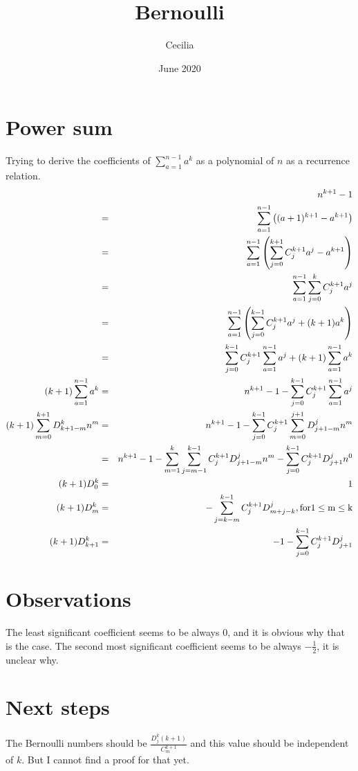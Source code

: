 \documentclass{article}
\title{Bernoulli}
\author{Cecilia}
\date{June 2020}
\begin{document}
\maketitle
\section{Power sum}
Trying to derive the coefficients of $ \sum\limits_{a=1}^{n-1} a^k $ as a polynomial of $ n $ as a recurrence relation.
\begin{eqnarray*}
& & n^{k+1} - 1 \\
  &=& \sum\limits_{a=1}^{n-1} \left((a + 1)^{k+1} - a^{k+1}\right) \\
  &=& \sum\limits_{a=1}^{n-1} \left(\sum\limits_{j=0}^{k+1}C_j^{k+1}a^j - a^{k+1}\right) \\
  &=& \sum\limits_{a=1}^{n-1} \sum\limits_{j=0}^{k}C_j^{k+1}a^j \\
  &=& \sum\limits_{a=1}^{n-1} \left(\sum\limits_{j=0}^{k-1}C_j^{k+1}a^j + (k+1)a^k \right) \\
  &=& \sum\limits_{j=0}^{k-1}C_j^{k+1}\sum\limits_{a=1}^{n-1} a^j + (k+1)\sum\limits_{a=1}^{n-1} a^k \\  
  (k+1)\sum\limits_{a=1}^{n-1} a^k &=& n^{k+1} - 1 - \sum\limits_{j=0}^{k-1}C_j^{k+1}\sum\limits_{a=1}^{n-1} a^j \\
  (k+1)\sum\limits_{m=0}^{k+1}D_{k+1-m}^kn^m &=& n^{k+1} - 1 - \sum\limits_{j=0}^{k-1}C_j^{k+1}\sum\limits_{m=0}^{j+1}D_{j+1-m}^jn^m \\
  &=& n^{k+1} - 1 - \sum\limits_{m=1}^{k}\sum\limits_{j=m-1}^{k-1}C_j^{k+1}D_{j+1-m}^jn^m - \sum\limits_{j=0}^{k-1}C_j^{k+1}D_{j+1}^jn^0 \\
  (k+1)D_0^k &=& 1 \\
  (k+1)D_m^k &=& -\sum\limits_{j=k-m}^{k-1}C_j^{k+1}D_{m+j-k}^j  \rm {, for } 1 \le m \le k \\
  (k+1)D_{k+1}^k &=& -1 -\sum\limits_{j=0}^{k-1}C_j^{k+1}D_{j+1}^j
\end{eqnarray*}

\section{Observations}
The least significant coefficient seems to be always 0, and it is obvious why that is the case. The second most significant coefficient seems to be always $ -\frac{1}{2} $, it is unclear why.

\section{Next steps}
The Bernoulli numbers should be $ \frac{D^k_j(k+1)}{C^{k+1}_m} $ and this value should be independent of $ k $. But I cannot find a proof for that yet.
\end{document}
